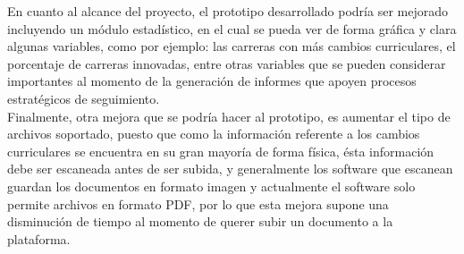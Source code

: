 	
	En cuanto al alcance del proyecto, el prototipo desarrollado podría ser mejorado incluyendo un módulo estadístico, en el cual se pueda ver de forma gráfica y clara algunas variables, como por ejemplo: las carreras con más cambios curriculares, el porcentaje de carreras innovadas, entre otras variables que se pueden considerar importantes al momento de la generación de informes que apoyen procesos estratégicos de seguimiento.
	\\
	
	Finalmente, otra mejora que se podría hacer al prototipo, es aumentar el tipo de archivos soportado, puesto que como la información referente a los cambios curriculares se encuentra en su gran mayoría de forma física, ésta información debe ser escaneada antes de ser subida, y generalmente los software que escanean guardan los documentos en formato imagen y actualmente el software solo permite archivos en formato PDF, por lo que esta mejora supone una disminución de tiempo al momento de querer subir un documento a la plataforma.